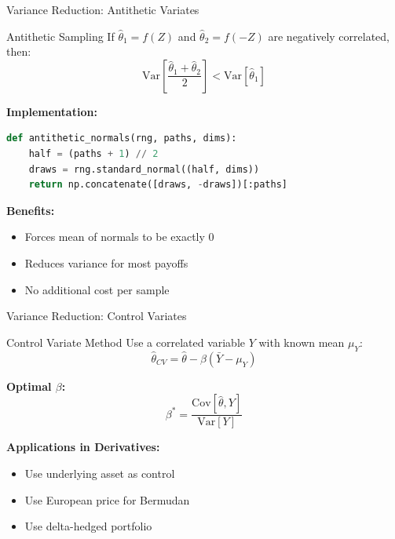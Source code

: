 \documentclass[aspectratio=169,11pt]{beamer}
\begin{document}
\begin{frame}[fragile]{Variance Reduction: Antithetic Variates}
\begin{block}{Antithetic Sampling}
If $\hat{\theta}_1 = f(Z)$ and $\hat{\theta}_2 = f(-Z)$ are negatively correlated, then:
\[
\text{Var}\left[\frac{\hat{\theta}_1 + \hat{\theta}_2}{2}\right] < \text{Var}[\hat{\theta}_1]
\]
\end{block}

\textbf{Implementation:}
\begin{lstlisting}[language=Python]
def antithetic_normals(rng, paths, dims):
    half = (paths + 1) // 2
    draws = rng.standard_normal((half, dims))
    return np.concatenate([draws, -draws])[:paths]
\end{lstlisting}

\textbf{Benefits:}
\begin{itemize}
    \item Forces mean of normals to be exactly 0
    \item Reduces variance for most payoffs
    \item No additional cost per sample
\end{itemize}
\end{frame}

\begin{frame}{Variance Reduction: Control Variates}
\begin{block}{Control Variate Method}
Use a correlated variable $Y$ with known mean $\mu_Y$:
\[
\hat{\theta}_{CV} = \hat{\theta} - \beta(\bar{Y} - \mu_Y)
\]
\end{block}

\textbf{Optimal $\beta$:}
\[
\beta^* = \frac{\text{Cov}[\hat{\theta}, Y]}{\text{Var}[Y]}
\]

\textbf{Applications in Derivatives:}
\begin{itemize}
    \item Use underlying asset as control
    \item Use European price for Bermudan
    \item Use delta-hedged portfolio
\end{itemize}
\end{frame}
\end{document}

